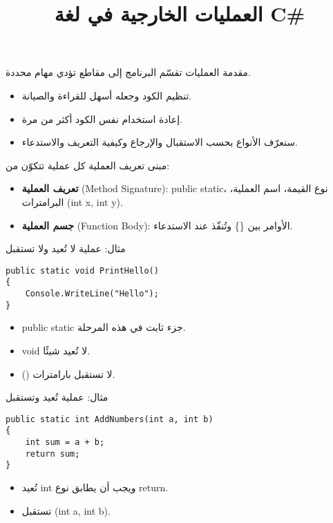 \documentclass[13pt]{beamer}
\title{العمليات الخارجية في لغة \textenglish{C\#}}
\author{}
\date{}
\begin{document}
\begin{frame}
  \titlepage
\end{frame}

\begin{frame}[fragile]{مقدمة}
العمليات تقسّم البرنامج إلى مقاطع تؤدي مهام محددة.
\begin{itemize}
  \item تنظيم الكود وجعله أسهل للقراءة والصيانة.
  \item إعادة استخدام نفس الكود أكثر من مرة.
  \item سنعرّف الأنواع بحسب الاستقبال والإرجاع وكيفية التعريف والاستدعاء.
\end{itemize}
\end{frame}

\begin{frame}[fragile]{مبنى تعريف العملية}
كل عملية تتكوّن من:
\begin{itemize}
  \item \textbf{تعريف العملية} \textenglish{(Method Signature)}: \textenglish{public static}، نوع القيمة، اسم العملية، البرامترات \textenglish{(int x, int y)}.
  \item \textbf{جسم العملية} \textenglish{(Function Body)}: الأوامر بين \textenglish{\{\}} وتُنفّذ عند الاستدعاء.
\end{itemize}
\end{frame}

\begin{frame}[fragile]{مثال: عملية لا تُعيد ولا تستقبل}
\begin{english}
\begin{lstlisting}[language=CSharp]
public static void PrintHello()
{
    Console.WriteLine("Hello");
}
\end{lstlisting}
\end{english}
\vspace{0.5em}
\begin{itemize}
  \item \textenglish{public static} جزء ثابت في هذه المرحلة.
  \item \textenglish{void} لا تُعيد شيئًا.
  \item \textenglish{()} لا تستقبل بارامترات.
\end{itemize}
\end{frame}

\begin{frame}[fragile]{مثال: عملية تُعيد وتستقبل}
\begin{english}
\begin{lstlisting}[language=CSharp]
public static int AddNumbers(int a, int b)
{
    int sum = a + b;
    return sum;
}
\end{lstlisting}
\end{english}
\vspace{0.5em}
\begin{itemize}
  \item تُعيد \textenglish{int} ويجب أن يطابق نوع \textenglish{return}.
  \item تستقبل \textenglish{(int a, int b)}.
\end{itemize}
\end{frame}
\end{document}
